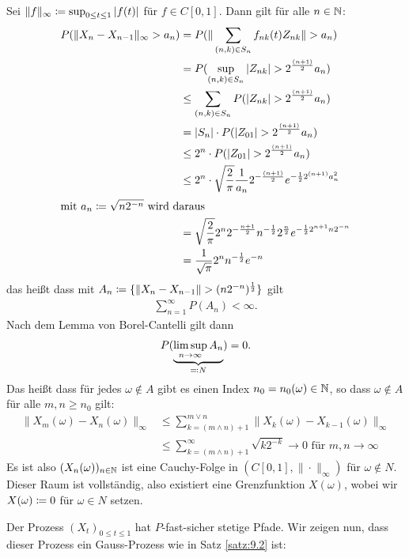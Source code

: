 \documentclass[a4paper,twoside,DIV15,BCOR12mm]{scrbook}
\begin{document}
\begin{beweis}
Sei $\|f\|_{\infty}\da \sup_{0\le t\le 1}|f(t)|$ für $f\in C[0,1]$. Dann gilt für alle $n\in \mathbb{N}$: 
\begin{align*}
P(\|X_n - X_{n-1}\|_{\infty} > a_n) &= P(\|\sum_{(n,k)\in S_n}f_{nk}(t) Z_{nk}\| > a_n) \\
&= P(\sup_{(n,k)\in S_n} |Z_{nk}| > 2^{\frac{(n+1)}2} a_n) \\
&\le \sum_{(n,k)\in S_n} P(|Z_{nk}| > 2^{\frac{(n+1)}2} a_n) \\
&= |S_n| \cdot P(|Z_{01}| > 2^{\frac{(n+1)}2} a_n) \\
&\le 2^n\cdot P(|Z_{01}| > 2^{\frac{(n+1)}2} a_n) \\
&\le 2^n\cdot \sqrt {\frac2\pi}\frac 1 {a_n} 2^{-\frac{(n+1)}2}  e^{-\frac1 2  2^{(n+1)} a_n^2} \\
\intertext{mit $a_n\da \sqrt{n2^{-n}}$ wird daraus}
&= \sqrt {\frac2\pi} 2^n 2^{-\frac{n+1}2} n^{-\frac 12} 2^{\frac n2} e^{-\frac 12 2^{n+1} n 2^{-n} } \\
&= \frac1{\sqrt \pi} 2^n n^{-\frac12} e^{-n} \\
\end{align*}
das heißt dass mit $A_n\da \{\|X_n-X_{n-1}\|> (n2^{-n})^{\frac12}\}$ gilt 
\begin{align*}
\sum_{n=1}^\infty P(A_n) <\infty.
\end{align*}
Nach dem Lemma von Borel-Cantelli gilt dann
\begin{align*}
P(\underbrace{\limsup_{n\to\infty} A_n}_{\ad N}) = 0.
\end{align*}
Das heißt dass für jedes $\omega \notin A$ gibt es einen Index $n_0=n_0(\omega)\in \mathbb{N}$, so dass $\omega \notin A$ für alle $m,n\ge n_0$ gilt:
\begin{align*}
\|X_m(\omega)-X_n(\omega)\|_\infty &\le \sum_{k=(m\wedge n)+1}^{m\vee n} \|X_k(\omega)-X_{k-1}(\omega)\|_\infty \\
&\le \sum_{k=(m\wedge n)+1}^{\infty} \sqrt{k2^{-k}} \to 0 \text{ für } m,n\to\infty
\end{align*}
Es ist also $(X_n(\omega))_{n\in \mathbb{N}}$ ist eine Cauchy-Folge in $(C[0,1],\|\cdot\|_\infty)$ für $\omega \notin N$. Dieser Raum ist vollständig, also existiert eine Grenzfunktion $X(\omega)$, wobei wir $X(\omega)\da0$ für $\omega\in N$ setzen.

Der Prozess $(X_t)_{0\le t\le 1}$ hat $P$-fast-sicher stetige Pfade. Wir zeigen nun, dass dieser Prozess ein Gauss-Prozess wie in Satz \ref{satz:9.2} ist:


\end{beweis}
\end{document}

